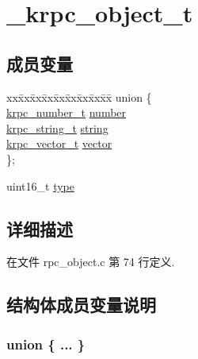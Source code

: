 \hypertarget{struct__krpc__object__t}{}\section{\+\_\+krpc\+\_\+object\+\_\+t}
\label{struct__krpc__object__t}
\subsection*{成员变量}
\begin{DoxyCompactItemize}
\item 
\begin{tabbing}
xx\=xx\=xx\=xx\=xx\=xx\=xx\=xx\=xx\=\kill
union \{\\
\>\hyperlink{config_8h_a8908a2b782375965d6d55fa0bfe14a8f}{krpc\_number\_t} \hyperlink{struct__krpc__object__t_acd272fd951a996ef4a486cc0dc84b479}{number}\\
\>\hyperlink{config_8h_a813bf05b2aa7582f20a142644e961e9b}{krpc\_string\_t} \hyperlink{struct__krpc__object__t_aeac37359c23a46158ff0f269f05ced93}{string}\\
\>\hyperlink{config_8h_af9c53e08bd04353abcdf8e0720e4c4c8}{krpc\_vector\_t} \hyperlink{struct__krpc__object__t_afc254d064329050df6ed7d055faaae24}{vector}\\
\}; \\

\end{tabbing}\item 
uint16\+\_\+t \hyperlink{struct__krpc__object__t_acb5cfd209ba75c853d03f701e7f91679}{type}
\end{DoxyCompactItemize}


\subsection{详细描述}


在文件 rpc\+\_\+object.\+c 第 74 行定义.



\subsection{结构体成员变量说明}
\hypertarget{struct__krpc__object__t_ad184a879bca4b31d95d98355a0dfccfe}{}\subsubsection[{"@3}]{\setlength{\rightskip}{0pt plus 5cm}union \{ ... \} }\label{struct__krpc__object__t_ad184a879bca4b31d95d98355a0dfccfe}
\hypertarget{struct__krpc__object__t_acd272fd951a996ef4a486cc0dc84b479}{}
